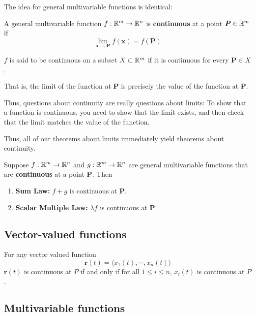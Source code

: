 The idea for general multivariable functions is identical:

\begin{definition}
    A general multivariable function $f: \mathbb{R}^m \to \mathbb{R}^n$ is \textbf{continuous} at a point $\bm{P} \in \mathbb{R}^m$ if 
    $$\lim_{\bm{x} \to \bm{P}} f(\bm{x}) = f(\bm{P})$$
    
    $f$ is said to be continuous on a subset $X \subset \mathbb{R}^m$ if it is continuous for every $\bm{P} \in X$.
    
    \end{definition}

That is, the limit of the function at $\bm{P}$ is precisely the value of the function at $\bm{P}$.

Thus, questions about continuity are really questions about limits:  To show that a function is continuous, you need to show that the limit exists, and then check that the limit matches the value of the function.

Thus, all of our theorems about limits immediately yield theorems about continuity.

\begin{theorem}
    Suppose $f: \mathbb{R}^m \to \mathbb{R}^n$ and $g: \mathbb{R}^m \to \mathbb{R}^n$ are general multivariable functions that are \textbf{continuous} at a point $\bm{P}$. Then
    
    \begin{enumerate}
        \item \textbf{Sum Law:} $f+g$ is continuous at $\bm{P}$.
        \item \textbf{Scalar Multiple Law:} $\lambda f$ is continuous at $\bm{P}$.

    \end{enumerate}
    
    
    \end{theorem}

\subsection{Vector-valued functions}

\begin{proposition}
   For any vector valued function $$\bm{r}(t) = \langle x_1(t), \cdots, x_n(t) \rangle$$ 
   $\bm{r}(t)$ is continuous at $P$ if and only if for all $1 \leq i \leq n$, $x_i(t)$ is continuous at $P$.
    \end{proposition}


    \subsection{Multivariable functions}

